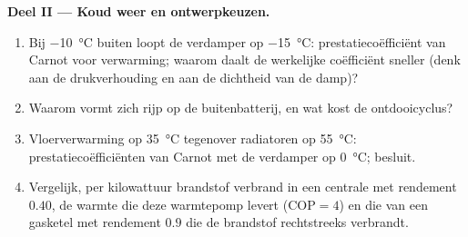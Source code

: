 \begin{problem}
\textbf{Deel II --- Koud weer en ontwerpkeuzen.}
\begin{enumerate}[resume]
  \item Bij \qty{-10}{\celsius} buiten loopt de verdamper op
        \qty{-15}{\celsius}: prestatiecoëfficiënt van Carnot voor
        verwarming; waarom daalt de werkelijke
        coëfficiënt sneller (denk aan de drukverhouding en aan de
        dichtheid van de damp)?
  \item Waarom vormt zich rijp op de buitenbatterij, en wat kost de
        ontdooicyclus?
  \item Vloerverwarming op \qty{35}{\celsius} tegenover radiatoren op
        \qty{55}{\celsius}: prestatiecoëfficiënten van Carnot met de verdamper op
        \qty{0}{\celsius}; besluit.
  \item Vergelijk, per kilowattuur brandstof verbrand in een centrale met
        rendement $0.40$, de warmte die deze warmtepomp levert
        ($\mathrm{COP}
        = 4$) en die van een gasketel met rendement
        $0.9$ die de brandstof
        rechtstreeks verbrandt.
\end{enumerate}


\end{problem}
